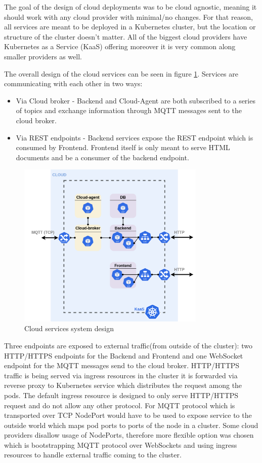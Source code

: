 The goal of the design of cloud deployments was to be cloud agnostic, meaning it should work with any cloud provider with minimal/no changes. For that reason, all services are meant to be deployed in a Kubernetes cluster, but the location or structure of the cluster doesn't matter. All of the biggest cloud providers have Kubernetes as a Service (KaaS) offering moreover it is very common along smaller providers as well.

The overall design of the cloud services can be seen in figure \ref{fig:cloud_services}. Services are communicating with each other in two ways:
\begin{itemize}
    \item Via Cloud broker - Backend and Cloud-Agent are both subscribed to a series of topics and exchange information through MQTT messages sent to the cloud broker. 
    \item Via REST endpoints - Backend services expose the REST endpoint which is consumed by Frontend. Frontend itself is only meant to serve HTML documents and be a consumer of the backend endpoint.
\end{itemize}

\begin{figure}[H]
    \centering
    \includegraphics[width=0.8\textwidth]{pictures/cloud_services.png}
    \caption{ Cloud services system design }
    \label{fig:cloud_services}
\end{figure}

Three endpoints are exposed to external traffic(from outside of the cluster): two HTTP/HTTPS endpoints for the Backend and Frontend and one WebSocket endpoint for the MQTT messages send to the cloud broker.
HTTP/HTTPS traffic is being served via ingress resources in the cluster it is forwarded via reverse proxy to Kubernetes service which distributes the request among the pods. The default ingress resource is designed to only serve HTTP/HTTPS request and do not allow any other protocol. For MQTT protocol which is transported over TCP NodePort would have to be used to expose service to the outside world which maps pod ports to ports of the node in a cluster. Some cloud providers disallow usage of NodePorts, therefore more flexible option was chosen which is bootstrapping MQTT protocol over WebSockets and using ingress resources to handle external traffic coming to the cluster.
